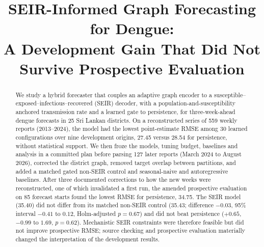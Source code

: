 \documentclass[conference]{IEEEtran}
\begin{document}
\title{SEIR-Informed Graph Forecasting for Dengue: \\ A Development Gain That Did Not Survive Prospective Evaluation}

\author{
}

\maketitle

\begin{abstract}
We study a hybrid forecaster that couples an adaptive graph encoder to a susceptible--exposed--infectious--recovered (SEIR) decoder, with a population-and-susceptibility anchored transmission rate and a learned gate to persistence, for three-week-ahead dengue forecasts in 25 Sri Lankan districts.
On a reconstructed series of 559 weekly reports (2013--2024), the model had the lowest point-estimate RMSE among 30 learned configurations over nine development origins, 27.45 versus 28.54 for persistence, without statistical support. %
We then froze the models, tuning budget, baselines and analysis in a committed plan before parsing 127 later reports (March 2024 to August 2026), corrected the district graph, removed target overlap between partitions, and added a matched gated non-SEIR control and seasonal-naive and autoregressive baselines.
After three documented corrections to how the new weeks were reconstructed, one of which invalidated a first run, the amended prospective evaluation on 85 forecast starts found the lowest RMSE for persistence, 34.75. %
The SEIR model (35.40) did not differ from its matched non-SEIR control (35.43; difference $-0.03$, 95\% interval $-0.41$ to $0.12$, Holm-adjusted $p=0.67$) and did not beat persistence ($+0.65$, $-0.99$ to $1.69$, $p=0.62$). %
Mechanistic SEIR constraints were therefore feasible but did not improve prospective RMSE; source checking and prospective evaluation materially changed the interpretation of the development results.
\end{abstract}
\end{document}
